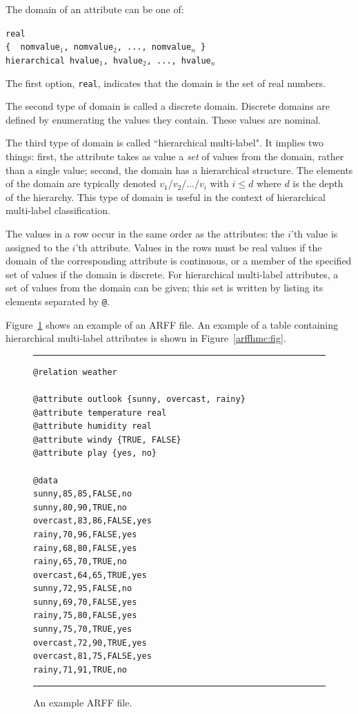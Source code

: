 \documentclass[a4paper]{report}
\begin{document}
The domain of an attribute can be one of:
\begin{tabbing}
\tt real\\
{\tt \{ } nomvalue$_1$, nomvalue$_2$, ..., nomvalue$_n$ {\tt \} }\\
{\tt hierarchical} hvalue$_1$, hvalue$_2$, ..., hvalue$_n$
\end{tabbing}

The first option, {\tt real}, indicates that the domain is the set of real numbers.

The second type of domain is called a discrete domain.  Discrete domains are defined by enumerating the values they contain.  These values are nominal.

The third type of domain is called ``hierarchical multi-label".  It implies two things: first, the attribute takes as value a {\em set} of values from the domain, rather than a single value; second, the domain has a hierarchical structure.  The elements of the domain are typically denoted $v_1/v_2/.../v_i$ with $i \leq d$ where $d$ is the depth of the hierarchy.  This type of domain is useful in the context of hierarchical multi-label classification.  

The values in a	 row occur in the same order as the attributes: the $i$'th value is assigned to the $i$'th attribute.  Values in the rows must be real values if the domain of the corresponding attribute is continuous, or a member of the specified set of values if the domain is discrete.  For hierarchical multi-label attributes, a set of values from the domain can be given; this set is written by listing its elements separated by \verb^@^.

Figure~\ref{arff:fig} shows an example of an ARFF file.  An example of a table containing hierarchical multi-label attributes is shown in Figure~\ref{arffhmc:fig}.

\begin{figure}
\hrule
\begin{verbatim}
@relation weather

@attribute outlook {sunny, overcast, rainy}
@attribute temperature real
@attribute humidity real
@attribute windy {TRUE, FALSE}
@attribute play {yes, no}

@data
sunny,85,85,FALSE,no
sunny,80,90,TRUE,no
overcast,83,86,FALSE,yes
rainy,70,96,FALSE,yes
rainy,68,80,FALSE,yes
rainy,65,70,TRUE,no
overcast,64,65,TRUE,yes
sunny,72,95,FALSE,no
sunny,69,70,FALSE,yes
rainy,75,80,FALSE,yes
sunny,75,70,TRUE,yes
overcast,72,90,TRUE,yes
overcast,81,75,FALSE,yes
rainy,71,91,TRUE,no
\end{verbatim}
\hrule
\caption{An example ARFF file.}
\label{arff:fig}
\end{figure}
\end{document}
